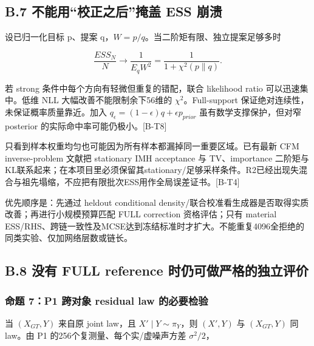 \documentclass[
  11pt,
  a4paper,
]{article}
\begin{document}
\hypertarget{b.7-ux4e0dux80fdux7528ux6821ux6b63ux4e4bux540eux63a9ux76d6-ess-ux5d29ux6e83}{%
\subsection{B.7 不能用``校正之后''掩盖 ESS
崩溃}\label{b.7-ux4e0dux80fdux7528ux6821ux6b63ux4e4bux540eux63a9ux76d6-ess-ux5d29ux6e83}}

设已归一化目标 p、提案 q，\(W=p/q\)。当二阶矩有限、独立提案足够多时

\[
\frac{ESS_N}{N}\to\frac{1}{E_qW^2}=\frac{1}{1+\chi^2(p\|q)}.
\]

若 strong 条件中每个方向有轻微但重复的错配，联合 likelihood ratio
可以迅速集中。低维 NLL 大幅改善不能限制余下56维的
\(\chi^2\)。Full-support 保证绝对连续性，未保证概率质量靠近。加入
\(q_\epsilon=(1-\epsilon)q+\epsilon p_{prior}\) 虽有数学支撑保护，但对窄
posterior 的实际命中率可能仍极小。{[}B-T8{]}

只看到样本权重均匀也可能因为所有样本都漏掉同一重要区域。已有最新 CFM
inverse-problem 文献把 stationary IMH acceptance 与 TV、importance
二阶矩与KL联系起来；在本项目里必须保留其stationary/足够采样条件。R2已经出现失混合与祖先塌缩，不应把有限批次ESS用作全局误差证书。{[}B-T4{]}

优先顺序是：先通过 heldout conditional
density/联合校准看生成器是否取得实质改善；再进行小规模预算匹配 FULL
correction 资格评估；只有 material
ESS/RHS、跨链一致性及MCSE达到冻结标准时才扩大。不能重复4096全拒绝的同类实验、仅加网络层数或链长。

\hypertarget{b.8-ux6ca1ux6709-full-reference-ux65f6ux4ecdux53efux505aux4e25ux683cux7684ux72ecux7acbux8bc4ux4ef7}{%
\subsection{B.8 没有 FULL reference
时仍可做严格的独立评价}\label{b.8-ux6ca1ux6709-full-reference-ux65f6ux4ecdux53efux505aux4e25ux683cux7684ux72ecux7acbux8bc4ux4ef7}}

\hypertarget{ux547dux9898-7p1-ux8de8ux5bf9ux8c61-residual-law-ux7684ux5fc5ux8981ux68c0ux9a8c}{%
\subsubsection{命题 7：P1 跨对象 residual law
的必要检验}\label{ux547dux9898-7p1-ux8de8ux5bf9ux8c61-residual-law-ux7684ux5fc5ux8981ux68c0ux9a8c}}

当 \((X_{GT},Y)\) 来自原 joint law，且 \(X'\mid Y\sim\pi_Y\)，则
\((X',Y)\) 与 \((X_{GT},Y)\) 同 law。由 P1
的256个复测量、每个实/虚噪声方差 \(\sigma^2/2\)，
\end{document}
